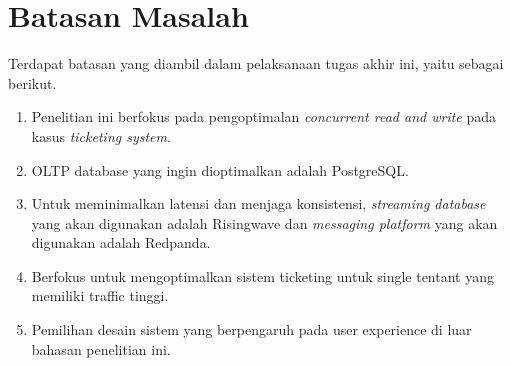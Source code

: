 \section{Batasan Masalah}
\label{sec:batasan-masalah}

Terdapat batasan yang diambil dalam pelaksanaan tugas akhir ini, yaitu sebagai berikut.

\begin{enumerate}
  \item Penelitian ini berfokus pada pengoptimalan \textit{concurrent read and write} pada kasus \textit{ticketing system}.
  \item OLTP database yang ingin dioptimalkan adalah PostgreSQL.
  \item Untuk meminimalkan latensi dan menjaga konsistensi, \textit{streaming database} yang akan digunakan adalah Risingwave dan \textit{messaging platform} yang akan digunakan adalah Redpanda.
  \item Berfokus untuk mengoptimalkan sistem ticketing untuk single tentant yang memiliki traffic tinggi.
  \item Pemilihan desain sistem yang berpengaruh pada user experience di luar bahasan penelitian ini.
\end{enumerate}

